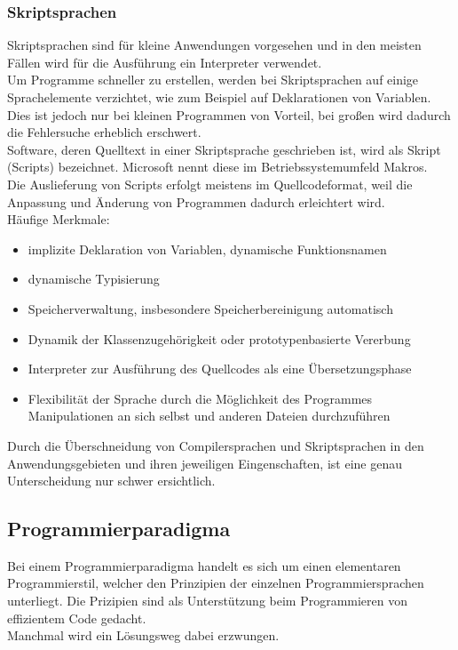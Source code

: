 \documentclass[12pt,a4paper]{report}
\begin{document}
\begin{onehalfspace}
\subsubsection{Skriptsprachen}
Skriptsprachen sind für kleine Anwendungen vorgesehen und in den meisten Fällen wird für die Ausführung ein Interpreter verwendet.\\
Um Programme schneller zu erstellen, werden bei Skriptsprachen auf einige Sprachelemente verzichtet, wie zum Beispiel auf Deklarationen von Variablen. Dies ist jedoch nur bei kleinen Programmen von Vorteil, bei großen wird dadurch die Fehlersuche erheblich erschwert.\\
Software, deren Quelltext in einer Skriptsprache geschrieben ist, wird als Skript (Scripts) bezeichnet. Microsoft nennt diese im Betriebssystemumfeld Makros.\\
Die Auslieferung von Scripts erfolgt meistens im Quellcodeformat, weil die Anpassung und Änderung von Programmen dadurch erleichtert wird.
\\Häufige Merkmale:
\begin{itemize}
\item implizite Deklaration von Variablen, dynamische Funktionsnamen
\item dynamische Typisierung
\item Speicherverwaltung, insbesondere Speicherbereinigung automatisch
\item Dynamik der Klassenzugehörigkeit oder prototypenbasierte Vererbung
\item Interpreter zur Ausführung des Quellcodes als eine Übersetzungsphase
\item Flexibilität der Sprache durch die Möglichkeit des Programmes Manipulationen an sich selbst und anderen Dateien durchzuführen
\end{itemize}
Durch die Überschneidung von Compilersprachen und Skriptsprachen in den Anwendungsgebieten und ihren jeweiligen Eingenschaften, ist eine genau Unterscheidung nur schwer ersichtlich.

\subsection{Programmierparadigma}
Bei einem Programmierparadigma handelt es sich um einen elementaren Programmierstil, welcher den Prinzipien der einzelnen Programmiersprachen unterliegt. Die Prizipien sind als Unterstützung beim Programmieren von effizientem Code gedacht.
\\Manchmal wird ein Lösungsweg dabei erzwungen.\\


\end{onehalfspace}
\end{document}
